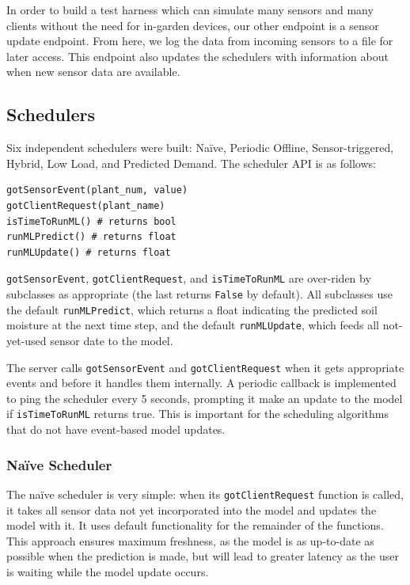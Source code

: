 \documentclass[a4paper]{acm_proc_article-sp}
\makeatletter
\newcommand{\Naive}{Na\"{i}ve\@\xspace}
\newcommand{\naive}{na\"{i}ve\@\xspace}
\makeatother
\begin{document}
In order to build a test harness which can simulate many sensors and many clients without the need for in-garden devices, our other endpoint is a sensor update endpoint.  From here, we log the data from incoming sensors to a file for later access.  This endpoint also updates the schedulers with information about when new sensor data are available.

\subsection{Schedulers}

Six independent schedulers were built: \Naive, Periodic Offline, Sensor-triggered, Hybrid, Low Load, and Predicted Demand.  The scheduler API is as follows:

\begin{lstlisting}
gotSensorEvent(plant_num, value)
gotClientRequest(plant_name)
isTimeToRunML() # returns bool
runMLPredict() # returns float
runMLUpdate() # returns float
\end{lstlisting}

\lstinline|gotSensorEvent|, \lstinline|gotClientRequest|, and \lstinline|isTimeToRunML| are over-riden by subclasses as appropriate (the last returns \lstinline|False| by default).  All subclasses use the default \lstinline|runMLPredict|, which returns a float indicating the predicted soil moisture at the next time step, and the default \lstinline|runMLUpdate|, which feeds all not-yet-used sensor date to the model.

The server calls \lstinline|gotSensorEvent| and \lstinline|gotClientRequest| when it gets appropriate events and before it handles them internally.  A periodic callback is implemented to ping the scheduler every 5 seconds, prompting it make an update to the model if \lstinline|isTimeToRunML| returns true.  This is important for the scheduling algorithms that do not have event-based model updates.

\subsubsection{\Naive Scheduler}

The \naive scheduler is very simple: when its \lstinline|gotClientRequest| function is called, it takes all sensor data not yet incorporated into the model and updates the model with it.  It uses default functionality for the remainder of the functions.  This approach ensures maximum freshness, as the model is as up-to-date as possible when the prediction is made, but will lead to greater latency as the user is waiting while the model update occurs.
\end{document}
